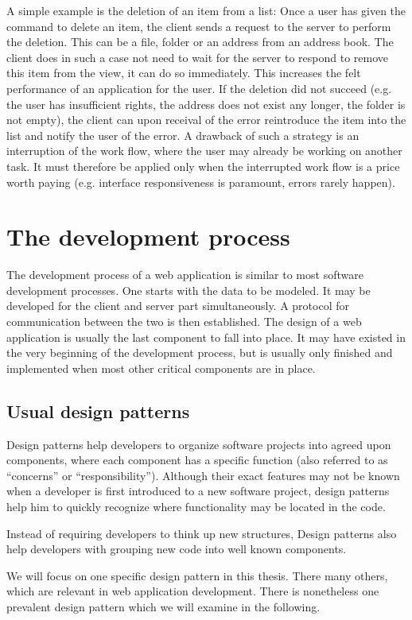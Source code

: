 \documentclass[thesis.tex]{subfiles}
\begin{document}
A simple example is the deletion of an item from a list: Once a user has given
the command to delete an item, the client sends a request to the
server to perform the deletion. This can be a file, folder or an address from an
address book. The client does in such a case not need to wait for the server to
respond to remove this item from the view, it can do so immediately.
This increases the felt performance of an application for the user.
If the deletion did not succeed (e.g. the user has insufficient rights,
the address does not exist any longer, the folder is not empty),
the client can upon receival of the error reintroduce the item into the list and
notify the user of the error.
A drawback of such a strategy is an interruption of the work flow,
where the user may already be working on another task.
It must therefore be applied only when the interrupted work flow is a price
worth paying (e.g. interface responsiveness is paramount, errors rarely happen). 

\section{The development process}
The development process of a web application is similar to most
software development processes. One starts with the data to be modeled.
It may be developed for the client and server part simultaneously.
A protocol for communication between the two is then established.
The design of a web application is usually the last component to fall
into place. It may have existed in the very beginning of the development
process, but is usually only finished and implemented when most other critical
components are in place.

\subsection{Usual design patterns}
Design patterns help developers to organize software projects into agreed upon
components, where each component has a specific function
(also referred to as ``concerns'' or ``responsibility'').
Although their exact features may not be known when a developer is first
introduced to a new software project, design patterns help him to quickly
recognize where functionality may be located in the code.

Instead of requiring developers to think up new structures, Design patterns
also help developers with grouping new code into well known components.

We will focus on one specific design pattern in this thesis. There many others,
which are relevant in web application development. There is nonetheless one
prevalent design pattern which we will examine in the following.
\end{document}
